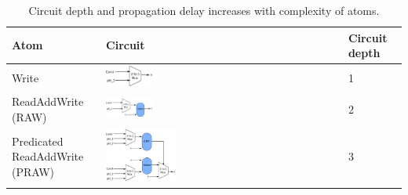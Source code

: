 \begin{table}[!t]
  \begin{scriptsize}
    \begin{tabular}{|p{}|p{}|p{}|}
  \hline
  Atom & Circuit & Circuit depth \\
  \hline
  Write & \includegraphics[width=0.2\textwidth]{rw.pdf} & 1 \\
  \hline
  ReadAddWrite (RAW) & \includegraphics[width=0.2\textwidth]{raw.pdf} & 2\\
  \hline
  \pbox{0.1\textwidth}
  {Predicated\\
  ReadAddWrite (PRAW)} & \includegraphics[width=0.3\textwidth]{pred_raw.pdf}  & 3\\
  \hline
  \end{tabular}
\end{scriptsize}
\caption{Circuit depth and propagation delay increases with complexity of atoms.}
  \label{tab:circuit_depth}
\end{table}

